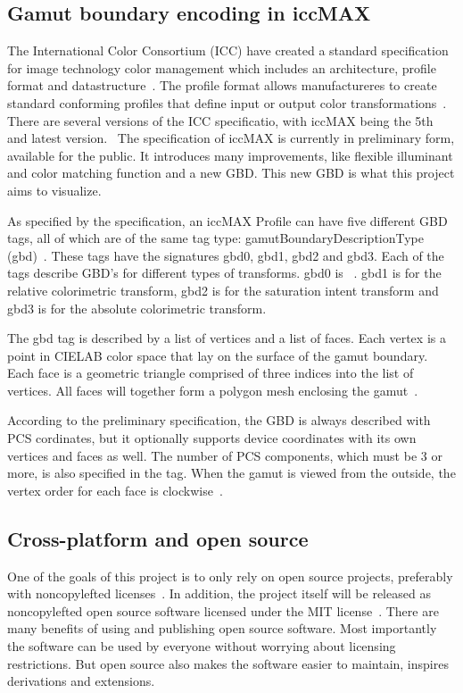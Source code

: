 \subsection{Gamut boundary encoding in iccMAX}
The International Color Consortium (ICC) have created a standard specification for image technology color management which includes an architecture, profile format and datastructure~\cite{ColorManagement}.
The profile format allows manufactureres to create standard conforming profiles that define input or output color transformations~\cite{ColorManagement}.
There are several versions of the ICC specificatio, with iccMAX being the 5th and latest version.~\cite{IccMax}
The specification of iccMAX is currently in preliminary form, available for the public.
It introduces many improvements, like flexible illuminant and color matching function and a new GBD.
This new GBD is what this project aims to visualize.

As specified by the specification, an iccMAX Profile can have five different GBD tags, all of which are of the same tag type: gamutBoundaryDescriptionType (gbd)~\cite{IccMaxSpec}.
These tags have the signatures gbd0, gbd1, gbd2 and gbd3.
Each of the tags describe GBD's for different types of transforms.
gbd0 is ~\cite{IccMaxSpec}.
gbd1 is for the relative colorimetric transform, gbd2 is for the saturation intent transform and gbd3 is for the absolute colorimetric transform.

The gbd tag is described by a list of vertices and a list of faces.
Each vertex is a point in CIELAB color space that lay on the surface of the gamut boundary.
Each face is a geometric triangle comprised of three indices into the list of vertices.
All faces will together form a polygon mesh enclosing the gamut~\cite{BaselineGamut}.

According to the preliminary specification, the GBD is always described with PCS cordinates, but it optionally supports device coordinates with its own vertices and faces as well.
The number of PCS components, which must be 3 or more, is also specified in the tag.
When the gamut is viewed from the outside, the vertex order for each face is clockwise~\cite{IccMaxSpec}.

\subsection{Cross-platform and open source}
\label{sec:crossplatform-open}
One of the goals of this project is to only rely on open source projects, preferably with noncopylefted licenses~\cite{GnuFreeCategories}.
In addition, the project itself will be released as noncopylefted open source software licensed under the MIT license~\cite{MitLicense}.
There are many benefits of using and publishing open source software.
Most importantly the software can be used by everyone without worrying about licensing restrictions.
But open source also makes the software easier to maintain, inspires derivations and extensions.

